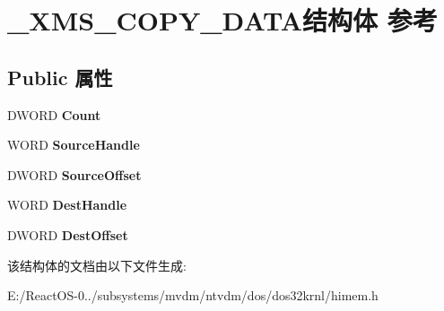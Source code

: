 \hypertarget{struct___x_m_s___c_o_p_y___d_a_t_a}{}\section{\+\_\+\+X\+M\+S\+\_\+\+C\+O\+P\+Y\+\_\+\+D\+A\+T\+A结构体 参考}
\label{struct___x_m_s___c_o_p_y___d_a_t_a}
\subsection*{Public 属性}
\begin{DoxyCompactItemize}
\item 
\mbox{\label{struct___x_m_s___c_o_p_y___d_a_t_a_aefa075e75043ceb76d61ea0d583482ef}} 
D\+W\+O\+RD {\bfseries Count}
\item 
\mbox{\label{struct___x_m_s___c_o_p_y___d_a_t_a_a5c82c50603c5c9edd737ad02803f033a}} 
W\+O\+RD {\bfseries Source\+Handle}
\item 
\mbox{\label{struct___x_m_s___c_o_p_y___d_a_t_a_a502d3d6118d5b5579a65a946200233f0}} 
D\+W\+O\+RD {\bfseries Source\+Offset}
\item 
\mbox{\label{struct___x_m_s___c_o_p_y___d_a_t_a_a80cf07e694d64ab69bce7e17bcd61760}} 
W\+O\+RD {\bfseries Dest\+Handle}
\item 
\mbox{\label{struct___x_m_s___c_o_p_y___d_a_t_a_a55b96cfa201855ffcf35fbd1993fadd8}} 
D\+W\+O\+RD {\bfseries Dest\+Offset}
\end{DoxyCompactItemize}


该结构体的文档由以下文件生成\+:\begin{DoxyCompactItemize}
\item 
E\+:/\+React\+O\+S-\/0../subsystems/mvdm/ntvdm/dos/dos32krnl/himem.\+h\end{DoxyCompactItemize}

